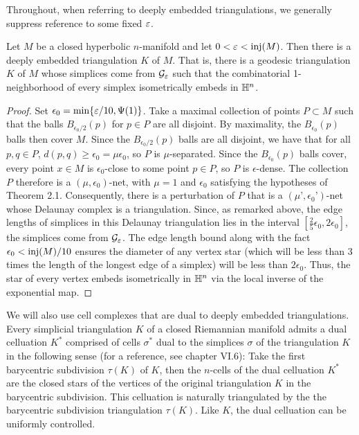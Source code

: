 Throughout, when referring to deeply embedded triangulations, we generally suppress reference to some fixed $\varepsilon$.

\begin{prop} \label{prop: existence}
Let $M$ be a closed hyperbolic $n$-manifold and let $0<\varepsilon < \operatorname{inj}(M)$. Then there is a deeply embedded triangulation $K$ of $M$. That is, there is a geodesic triangulation $K$ of $M$ whose simplices come from $\mathcal G_{\varepsilon}$ such that the combinatorial 1-neighborhood of every simplex isometrically embeds in $\mathbb H^n$.
\end{prop}

\begin{proof} Set $\epsilon_0 = \min\{\varepsilon/10,\Psi(1)\}$.
 Take a maximal collection of points $P\subset M$ such that the balls $B_{\epsilon_0/2}(p)$ for $p\in P$ are all disjoint. By maximality, the $B_{\epsilon_0}(p)$ balls then cover $M$.
 Since the $B_{\epsilon_0/2}(p)$ balls are all disjoint, we have that for all $p,q\in P$, $d(p,q) \geq \epsilon_0 = \mu {\epsilon_0} $, so $P$ is $\mu$-separated. Since the $B_{\epsilon_0}(p)$ balls cover, every point $x\in M$ is ${\epsilon_0} $-close to some point $p\in P$, so $P$ is ${\epsilon} $-dense.
 The collection $P$ therefore is a $(\mu, {\epsilon_0})$-net, with $\mu = 1$ and ${\epsilon_0} $ satisfying the hypotheses of Theorem 2.1. Consequently, there is a perturbation of $P$ that is a $(\mu’,{\epsilon_0}’)$-net whose Delaunay complex is a triangulation. Since, as remarked above, the edge lengths of simplices in this Delaunay triangulation lies in the interval $[\frac{2}{5} {\epsilon_0} ,2 {\epsilon_0}]$, the simplices come from $\mathcal G_{\varepsilon} $.
 The edge length bound along with the fact ${\epsilon_0} < \operatorname{inj}(M)/10$ ensures the diameter of any vertex star (which will be less than 3 times the length of the longest edge of a simplex) will be less than $2 {\epsilon_0}$. Thus, the star of every vertex embeds isometrically in $\mathbb H^n$ via the local inverse of the exponential map. \end{proof}

We will also use cell complexes that are dual to deeply embedded triangulations. Every simplicial triangulation $K$ of a closed Riemannian manifold admits a dual celluation $K^*$ comprised of cells $\sigma^*$ dual to the simplices $\sigma$ of the triangulation $K$ in the following sense (for a reference, see \cite{bredon} chapter VI.6): Take the first barycentric subdivision $\tau(K)$ of $K$, then the $n$-cells of the dual celluation $K^*$ are the closed stars of the vertices of the original triangulation $K$ in the barycentric subdivision. This celluation is naturally triangulated by the the barycentric subdivision triangulation $\tau(K)$. Like $K$, the dual celluation can be uniformly controlled.

